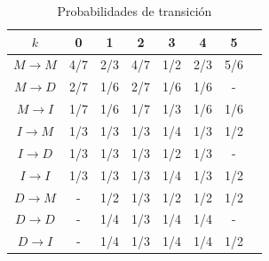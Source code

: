 \begin{exampleth}
\begin{table}[H]
    \centering
    \begin{tabular}{|c|C|C|C|C|C|C|C|}
        \hline
        $k$ & 0 & 1 & 2 & 3 & 4 & 5  \\
        \hline
        $M\rightarrow M$ & 4/7 & 2/3 & 4/7 & 1/2 & 2/3 & 5/6\\
        $M\rightarrow D$ & 2/7 & 1/6 & 2/7 & 1/6 & 1/6 & - \\
        $M\rightarrow I$ & 1/7 & 1/6 & 1/7 & 1/3 & 1/6 & 1/6 \\
        \hline
        $I\rightarrow M$ & 1/3 & 1/3 & 1/3 & 1/4 & 1/3 & 1/2 \\
        $I\rightarrow D$ & 1/3 & 1/3 & 1/3 & 1/2 & 1/3 & - \\
        $I\rightarrow I$ & 1/3 & 1/3 & 1/3 & 1/4 & 1/3 & 1/2 \\
        \hline
        $D\rightarrow M$ & - & 1/2 & 1/3 & 1/2 & 1/2 & 1/2 \\
        $D\rightarrow D$ & - & 1/4 & 1/3 & 1/4 & 1/4 & - \\
        $D\rightarrow I$ & - & 1/4 & 1/3 & 1/4 & 1/4 & 1/2 \\
        \hline
    \end{tabular}
    \caption{Probabilidades de transición}
\end{table}
    
\end{exampleth}

